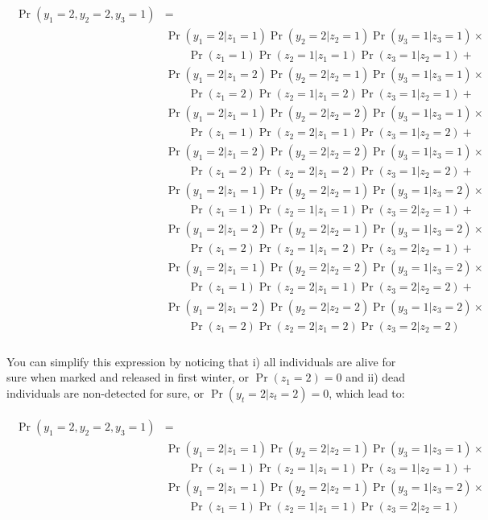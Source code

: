\documentclass[
  12pt,
]{krantz}
\begin{document}
\begin{align*}
\begin{split}
\Pr(y_1 = 2, y_2 = 2, y_3 = 1) &= \\
& \Pr(y_1 = 2 | z_1 = 1) \Pr(y_2 = 2 | z_2 = 1) \Pr(y_3 = 1 | z_3 = 1) \times \\ 
& \qquad \Pr(z_1 = 1) \Pr(z_2 = 1 | z_1 = 1) \Pr(z_3 = 1 | z_2 = 1) +\\
&  \Pr(y_1 = 2 | z_1 = 2) \Pr(y_2 = 2 | z_2 = 1) \Pr(y_3 = 1 | z_3 = 1) \times\\ 
& \qquad \Pr(z_1 = 2) \Pr(z_2 = 1 | z_1 = 2) \Pr(z_3 = 1 | z_2 = 1) +\\
&  \Pr(y_1 = 2 | z_1 = 1) \Pr(y_2 = 2 | z_2 = 2) \Pr(y_3 = 1 | z_3 = 1) \times\\ 
& \qquad \Pr(z_1 = 1) \Pr(z_2 = 2 | z_1 = 1) \Pr(z_3 = 1 | z_2 = 2) +\\
&  \Pr(y_1 = 2 | z_1 = 2) \Pr(y_2 = 2 | z_2 = 2) \Pr(y_3 = 1 | z_3 = 1) \times\\ 
& \qquad \Pr(z_1 = 2) \Pr(z_2 = 2 | z_1 = 2) \Pr(z_3 = 1 | z_2 = 2) +\\
&  \Pr(y_1 = 2 | z_1 = 1) \Pr(y_2 = 2 | z_2 = 1) \Pr(y_3 = 1 | z_3 = 2) \times\\ 
& \qquad \Pr(z_1 = 1) \Pr(z_2 = 1 | z_1 = 1) \Pr(z_3 = 2 | z_2 = 1) +\\
&  \Pr(y_1 = 2 | z_1 = 2) \Pr(y_2 = 2 | z_2 = 1) \Pr(y_3 = 1 | z_3 = 2) \times\\ 
& \qquad \Pr(z_1 = 2) \Pr(z_2 = 1 | z_1 = 2) \Pr(z_3 = 2 | z_2 = 1) +\\
&  \Pr(y_1 = 2 | z_1 = 1) \Pr(y_2 = 2 | z_2 = 2) \Pr(y_3 = 1 | z_3 = 2) \times\\ 
& \qquad \Pr(z_1 = 1) \Pr(z_2 = 2 | z_1 = 1) \Pr(z_3 = 2 | z_2 = 2) +\\
&  \Pr(y_1 = 2 | z_1 = 2) \Pr(y_2 = 2 | z_2 = 2) \Pr(y_3 = 1 | z_3 = 2) \times\\ 
& \qquad \Pr(z_1 = 2) \Pr(z_2 = 2 | z_1 = 2) \Pr(z_3 = 2 | z_2 = 2)\\
\end{split}
\end{align*}

You can simplify this expression by noticing that i) all individuals are alive for sure when marked and released in first winter, or \(\Pr(z_1=2) = 0\) and ii) dead individuals are non-detected for sure, or \(\Pr(y_t = 2|z_t = 2) = 0\), which lead to:

\begin{align*}
\begin{split}
\Pr(y_1 = 2, y_2 = 2, y_3 = 1) &= \\
& \Pr(y_1 = 2 | z_1 = 1) \Pr(y_2 = 2 | z_2 = 1) \Pr(y_3 = 1 | z_3 = 1) \times \\ 
& \qquad \Pr(z_1 = 1) \Pr(z_2 = 1 | z_1 = 1) \Pr(z_3 = 1 | z_2 = 1) +\\
&  \Pr(y_1 = 2 | z_1 = 1) \Pr(y_2 = 2 | z_2 = 1) \Pr(y_3 = 1 | z_3 = 2) \times\\ 
& \qquad \Pr(z_1 = 1) \Pr(z_2 = 1 | z_1 = 1) \Pr(z_3 = 2 | z_2 = 1)\\
\end{split}
\end{align*}
\end{document}
